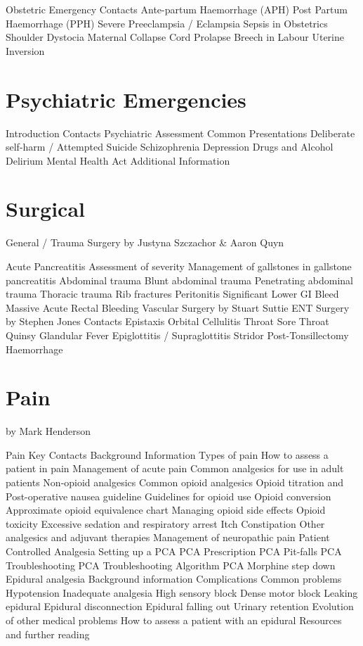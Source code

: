 \documentclass[]{book}
\begin{document}
Obstetric Emergency Contacts
Ante-partum Haemorrhage (APH)
Post Partum Haemorrhage (PPH)
Severe Preeclampsia / Eclampsia
Sepsis in Obstetrics
Shoulder Dystocia
Maternal Collapse
Cord Prolapse
Breech in Labour
Uterine Inversion

\hypertarget{psychemerg}{%
\chapter{Psychiatric Emergencies}\label{psychemerg}}

Introduction
Contacts
Psychiatric Assessment
Common Presentations
Deliberate self-harm / Attempted Suicide
Schizophrenia
Depression
Drugs and Alcohol
Delirium
Mental Health Act
Additional Information

\hypertarget{surg}{%
\chapter{Surgical}\label{surg}}

General / Trauma Surgery by Justyna Szczachor \& Aaron Quyn

Acute Pancreatitis
Assessment of severity
Management of gallstones in gallstone pancreatitis
Abdominal trauma
Blunt abdominal trauma
Penetrating abdominal trauma
Thoracic trauma
Rib fractures
Peritonitis
Significant Lower GI Bleed
Massive Acute Rectal Bleeding
Vascular Surgery by Stuart Suttie
ENT Surgery by Stephen Jones
Contacts
Epistaxis
Orbital Cellulitis
Throat
Sore Throat
Quinsy
Glandular Fever
Epiglottitis / Supraglottitis
Stridor
Post-Tonsillectomy Haemorrhage

\hypertarget{pain}{%
\chapter{Pain}\label{pain}}

by Mark Henderson

Pain
Key Contacts
Background Information
Types of pain
How to assess a patient in pain
Management of acute pain
Common analgesics for use in adult patients
Non-opioid analgesics
Common opioid analgesics
Opioid titration and Post-operative nausea guideline
Guidelines for opioid use
Opioid conversion
Approximate opioid equivalence chart
Managing opioid side effects
Opioid toxicity
Excessive sedation and respiratory arrest
Itch
Constipation
Other analgesics and adjuvant therapies
Management of neuropathic pain
Patient Controlled Analgesia
Setting up a PCA
PCA Prescription
PCA Pit-falls
PCA Troubleshooting
PCA Troubleshooting Algorithm
PCA Morphine step down
Epidural analgesia
Background information
Complications
Common problems
Hypotension
Inadequate analgesia
High sensory block
Dense motor block
Leaking epidural
Epidural disconnection
Epidural falling out
Urinary retention
Evolution of other medical problems
How to assess a patient with an epidural
Resources and further reading
\end{document}
